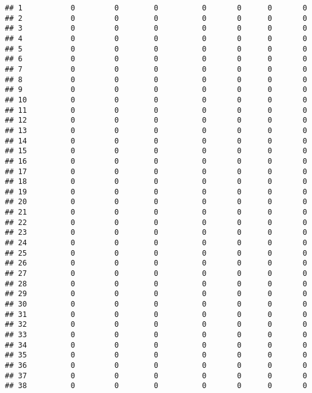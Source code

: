 \documentclass[
]{article}
\begin{document}
\begin{verbatim}
## 1           0         0        0          0       0      0       0
## 2           0         0        0          0       0      0       0
## 3           0         0        0          0       0      0       0
## 4           0         0        0          0       0      0       0
## 5           0         0        0          0       0      0       0
## 6           0         0        0          0       0      0       0
## 7           0         0        0          0       0      0       0
## 8           0         0        0          0       0      0       0
## 9           0         0        0          0       0      0       0
## 10          0         0        0          0       0      0       0
## 11          0         0        0          0       0      0       0
## 12          0         0        0          0       0      0       0
## 13          0         0        0          0       0      0       0
## 14          0         0        0          0       0      0       0
## 15          0         0        0          0       0      0       0
## 16          0         0        0          0       0      0       0
## 17          0         0        0          0       0      0       0
## 18          0         0        0          0       0      0       0
## 19          0         0        0          0       0      0       0
## 20          0         0        0          0       0      0       0
## 21          0         0        0          0       0      0       0
## 22          0         0        0          0       0      0       0
## 23          0         0        0          0       0      0       0
## 24          0         0        0          0       0      0       0
## 25          0         0        0          0       0      0       0
## 26          0         0        0          0       0      0       0
## 27          0         0        0          0       0      0       0
## 28          0         0        0          0       0      0       0
## 29          0         0        0          0       0      0       0
## 30          0         0        0          0       0      0       0
## 31          0         0        0          0       0      0       0
## 32          0         0        0          0       0      0       0
## 33          0         0        0          0       0      0       0
## 34          0         0        0          0       0      0       0
## 35          0         0        0          0       0      0       0
## 36          0         0        0          0       0      0       0
## 37          0         0        0          0       0      0       0
## 38          0         0        0          0       0      0       0

\end{verbatim}
\end{document}
